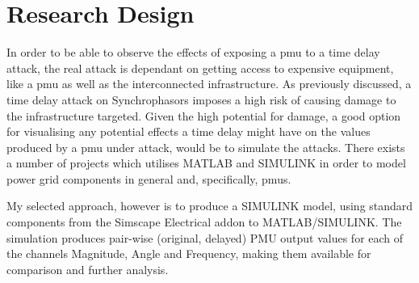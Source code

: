 




\section{Research Design}

In order to be able to observe the effects of exposing a \acrshort{pmu} to a time delay attack, the real attack is dependant on getting access to expensive equipment, like a \acrshort{pmu} as well as the interconnected infrastructure.
As previously discussed, a time delay attack on Synchrophasors imposes a high risk of causing damage to the infrastructure targeted.
Given the high potential for damage, a good option for visualising any potential effects a time delay might have on the values produced by a \acrshort{pmu} under attack, would be to simulate the attacks.
There exists a number of projects which utilises MATLAB and SIMULINK in order to model power grid components in general and, specifically, \acrshort{pmu}s.

My selected approach, however is to produce a SIMULINK model, using standard components from the Simscape Electrical addon to MATLAB/SIMULINK. The simulation produces pair-wise (original, delayed) PMU output values for each of the channels Magnitude, Angle and Frequency, making them available for comparison and further analysis. 
%
%



